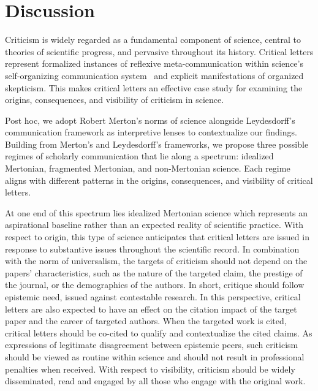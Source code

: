 \documentclass[12pt,a4paper]{article}
\numberwithin{equation}{section}
\begin{document}
%
%
%
\section*{Discussion}
Criticism is widely regarded as a fundamental component of science, central to theories of scientific progress, and pervasive throughout its history.
Critical letters represent formalized instances of reflexive meta-communication within science's self-organizing communication system~\cite{leydesdorff2001sociological,leydesdorff2010communication} and explicit manifestations of organized skepticism. This makes critical letters an effective case study for examining the origins, consequences, and visibility of criticism in science.

Post hoc, we adopt Robert Merton's norms of science alongside Leydesdorff's communication framework as interpretive lenses to contextualize our findings.
Building from Merton's and Leydesdorff's frameworks, we propose three possible regimes of scholarly communication that lie along a spectrum: idealized Mertonian, fragmented Mertonian, and non-Mertonian science.
Each regime aligns with different patterns in the origins, consequences, and visibility of critical letters.

At one end of this spectrum lies idealized Mertonian science which represents an aspirational baseline rather than an expected reality of scientific practice. 
With respect to origin, this type of science anticipates that critical letters are issued in response to substantive issues throughout the scientific record.
In combination with the norm of universalism, the targets of criticism should not depend on the papers' characteristics, such as the nature of the targeted claim, the prestige of the journal, or the demographics of the authors. 
In short, critique should follow epistemic need, issued against contestable research. 
In this perspective, critical letters are also expected to have an effect on the citation impact of the target paper and the career of targeted authors.
When the targeted work is cited, critical letters should be co-cited to qualify and contextualize the cited claims.
As expressions of legitimate disagreement between epistemic peers, such criticism should be viewed as routine within science and should not result in professional penalties when received.
With respect to visibility, criticism should be widely disseminated, read and engaged by all those who engage with the original work. 
\end{document}
